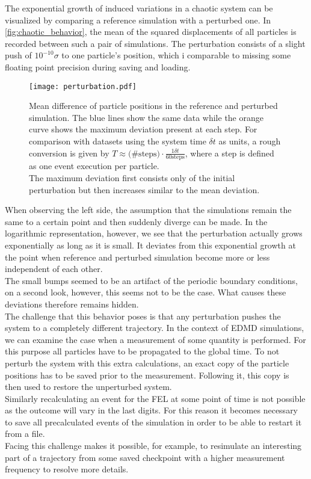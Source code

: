 The exponential growth of induced variations in a chaotic system can be visualized by comparing a reference simulation with a perturbed one. In \autoref{fig:chaotic_behavior}, the mean of the squared displacements of all particles is recorded between such a pair of simulations. The perturbation consists of a slight push of $10^{-10} \sigma$ to one particle's position, which i comparable to missing some floating point precision during saving and loading.\\

\begin{figure}[h]
\centering
\texttt{[image: perturbation.pdf]}
\caption[Exponential growth of perturbations in chaotic system]{Mean difference of particle positions in the reference and perturbed simulation. The blue lines show the same data while the orange curve shows the maximum deviation present at each step. For comparison with datasets using the system time $\delta t$ as units, a rough conversion is given by $T \approx \text{(\#steps)} \cdot \frac{1 \delta t}{60 \text{steps}}$, where a step is defined as one event execution per particle.\\ The maximum deviation first consists only of the initial perturbation but then increases similar to the mean deviation.}
\label{fig:chaotic_behavior}
\end{figure}

When observing the left side, the assumption that the simulations remain the same to a certain point and then suddenly diverge can be made. In the logarithmic representation, however, we see that the perturbation actually grows exponentially as long as it is small. It deviates from this exponential growth at the point when reference and perturbed simulation become more or less independent of each other.\\
The small bumps seemed to be an artifact of the periodic boundary conditions, on a second look, however, this seems not to be the case. What causes these deviations therefore remains hidden.\\

The challenge that this behavior poses is that any perturbation pushes the system to a completely different trajectory. In the context of EDMD simulations, we can examine the case when a measurement of some quantity is performed. For this purpose all particles have to be propagated to the global time. To not perturb the system with this extra calculations, an exact copy of the particle positions has to be saved prior to the measurement. Following it, this copy is then used to restore the unperturbed system.\\ 
Similarly recalculating an event for the FEL at some point of time is not possible as the outcome will vary in the last digits. For this reason it becomes necessary to save all precalculated events of the simulation in order to be able to restart it from a file.\\
Facing this challenge makes it possible, for example, to resimulate an interesting part of a trajectory from some saved checkpoint with a higher measurement frequency to resolve more details. 

